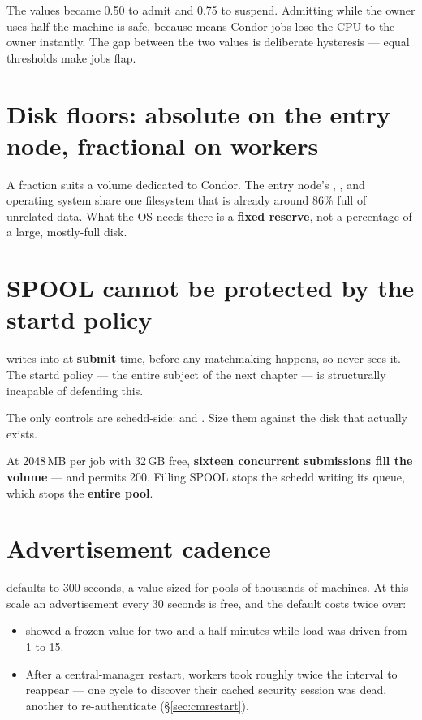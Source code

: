 The values became 0.50 to admit and 0.75 to suspend. Admitting while the owner
uses half the machine is safe, because  means Condor
jobs lose the CPU to the owner instantly. The gap between the two values is
deliberate hysteresis --- equal thresholds make jobs flap.

\section{Disk floors: absolute on the entry node, fractional on workers}

A fraction suits a volume dedicated to Condor. The entry node's ,
,  and operating system share one filesystem
that is already around 86\% full of unrelated data. What the OS needs there is a
\textbf{fixed reserve}, not a percentage of a large, mostly-full disk.

\section{SPOOL cannot be protected by the startd policy}

 writes into  at \textbf{submit} time,
before any matchmaking happens, so  never sees it. The startd policy
--- the entire subject of the next chapter --- is structurally incapable of
defending this.

The only controls are schedd-side:  and
. Size them against the disk that actually exists.

\begin{trap}
At 2048\,MB per job with 32\,GB free, \textbf{sixteen concurrent submissions
fill the volume} --- and  permits 200. Filling SPOOL
stops the schedd writing its queue, which stops the \textbf{entire pool}.
\end{trap}

\section{Advertisement cadence}

 defaults to 300 seconds, a value sized for pools of
thousands of machines. At this scale an advertisement every 30 seconds is free,
and the default costs twice over:

\begin{itemize}
  \item {} showed a frozen value for two and a half minutes
        while load was driven from 1 to 15.
  \item After a central-manager restart, workers took roughly twice the interval
        to reappear --- one cycle to discover their cached security session was
        dead, another to re-authenticate (\S\ref{sec:cmrestart}).
\end{itemize}

